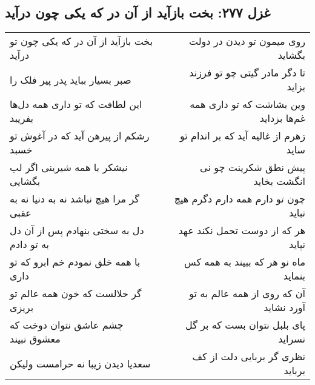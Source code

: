 \begin{center}
\section*{غزل ۲۷۷: بخت بازآید از آن در که یکی چون درآید}
\label{sec:277}
\begin{longtable}{l p{0.5cm} r}
بخت بازآید از آن در که یکی چون تو درآید
&&
روی میمون تو دیدن در دولت بگشاید
\\
صبر بسیار بباید پدر پیر فلک را
&&
تا دگر مادر گیتی چو تو فرزند بزاید
\\
این لطافت که تو داری همه دل‌ها بفریبد
&&
وین بشاشت که تو داری همه غم‌ها بزداید
\\
رشکم از پیرهن آید که در آغوش تو خسبد
&&
زهرم از غالیه آید که بر اندام تو ساید
\\
نیشکر با همه شیرینی اگر لب بگشایی
&&
پیش نطق شکرینت چو نی انگشت بخاید
\\
گر مرا هیچ نباشد نه به دنیا نه به عقبی
&&
چون تو دارم همه دارم دگرم هیچ نباید
\\
دل به سختی بنهادم پس از آن دل به تو دادم
&&
هر که از دوست تحمل نکند عهد نپاید
\\
با همه خلق نمودم خم ابرو که تو داری
&&
ماه نو هر که ببیند به همه کس بنماید
\\
گر حلالست که خون همه عالم تو بریزی
&&
آن که روی از همه عالم به تو آورد نشاید
\\
چشم عاشق نتوان دوخت که معشوق نبیند
&&
پای بلبل نتوان بست که بر گل نسراید
\\
سعدیا دیدن زیبا نه حرامست ولیکن
&&
نظری گر بربایی دلت از کف برباید
\\
\end{longtable}
\end{center}
